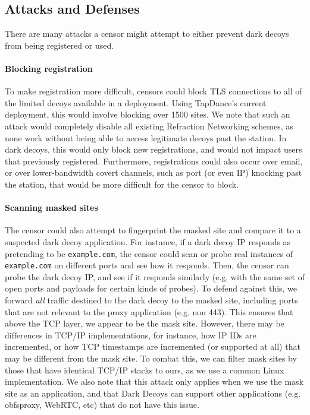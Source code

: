 \documentclass[letterpaper,twocolumn,10pt]{article}
\begin{document}
\TabCompare

\subsection{Attacks and Defenses}

There are many attacks a censor might attempt to either prevent dark decoys from
being registered or used.

\paragraph{Blocking registration}
To make registration more difficult, censors could block TLS connections to all of the
limited decoys available in a deployment. Using TapDance's current deployment,
this would involve blocking over 1500 sites. We note that such an attack would
completely disable all existing Refraction Networking schemes, as none work
without being able to access legitimate decoys past the station. In dark decoys,
this would only block new registrations, and would not impact users that
previously registered. Furthermore, registrations could also occur over email,
or over lower-bandwidth covert channels, such as port (or even IP) knocking past
the station, that would be more difficult for the censor to block.

\paragraph{Scanning masked sites}
The censor could also attempt to fingerprint the masked site and compare it to a
suspected dark decoy application. For instance, if a dark decoy IP responds as
pretending to be \texttt{example.com}, the censor could scan or probe real instances
of \texttt{example.com} on different ports and see how it responds. Then, the
censor can probe the dark decoy IP, and see if it responds similarly (e.g. with
the same set of open ports and payloads for certain kinds of probes). To defend
against this, we forward \emph{all} traffic destined to the dark decoy to the
masked site, including ports that are not relevant to the proxy application
(e.g. non 443). This ensures that above the TCP layer, we appear to be the mask
site. However, there may be differences in TCP/IP implementations, for instance,
how IP IDs are incremented, or how TCP timestamps are incremented (or supported
at all) that may be different from the mask site. To combat this, we can filter
mask sites by those that have identical TCP/IP stacks to ours, as we use a
common Linux implementation. We also note that this attack only applies when we
use the mask site as an application, and that Dark Decoys can support other
applications (e.g. obfsproxy, WebRTC, etc) that do not have this issue.
\end{document}
